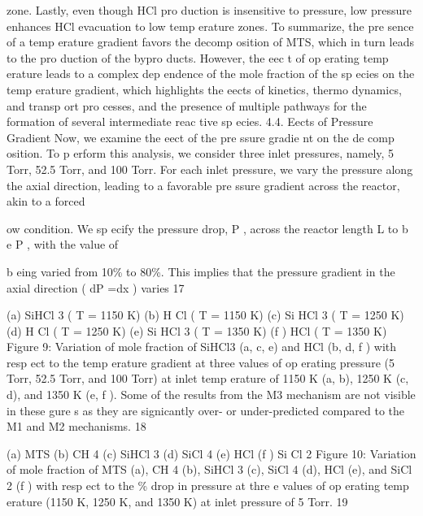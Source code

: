 \documentclass[10pt, letterpaper]{article}
\begin{document}
zone. Lastly, even though HCl pro duction is insensitive to pressure, low pressure enhances HCl evacuation
to low temp erature zones.
To summarize, the pre sence of a temp erature gradient favors the decomp osition of MTS, which in turn
leads to the pro duction of the bypro ducts. However, the eec t of op erating temp erature leads to a complex
dep endence of the mole fraction of the sp ecies on the temp erature gradient, which highlights the eects of
kinetics, thermo dynamics, and transp ort pro cesses, and the presence of multiple pathways for the formation
of several intermediate reac tive sp ecies.
4.4. Eects of Pressure Gradient
Now, we examine the eect of the pre ssure gradie nt on the de comp osition. To p erform this analysis, we
consider three inlet pressures, namely, 5 Torr, 52.5 Torr, and 100 Torr. For each inlet pressure, we vary the
pressure along the axial direction, leading to a favorable pre ssure gradient across the reactor, akin to a forced

ow condition. We sp ecify the pressure drop, 
P
, across the reactor length
L
to b e
 P
, with the value of

b eing varied from 10\% to 80\%. This implies that the pressure gradient in the axial direction (
dP =dx
) varies
17


(a) SiHCl
3
(
T
= 1150 K)
(b) H Cl (
T
= 1150 K)
(c) Si HCl
3
(
T
= 1250 K)
(d) H Cl (
T
= 1250 K)
(e) Si HCl
3
(
T
= 1350 K)
(f ) HCl (
T
= 1350 K)
Figure 9: Variation of mole fraction of SiHCl3 (a, c, e) and HCl (b, d, f ) with resp ect to the temp erature gradient at three values
of op erating pressure (5 Torr, 52.5 Torr, and 100 Torr) at inlet temp erature of 1150 K (a, b), 1250 K (c, d), and 1350 K (e, f ).
Some of the results from the M3 mechanism are not visible in these gure s as they are signicantly over- or under-predicted
compared to the M1 and M2 mechanisms.
18


(a) MTS
(b) CH
4
(c) SiHCl
3
(d) SiCl
4
(e) HCl
(f ) Si Cl
2
Figure 10: Variation of mole fraction of MTS (a), CH
4
(b), SiHCl
3
(c), SiCl
4
(d), HCl (e), and SiCl
2
(f ) with resp ect to the \%
drop in pressure at thre e values of op erating temp erature (1150 K, 1250 K, and 1350 K) at inlet pressure of 5 Torr.
19
\end{document}
